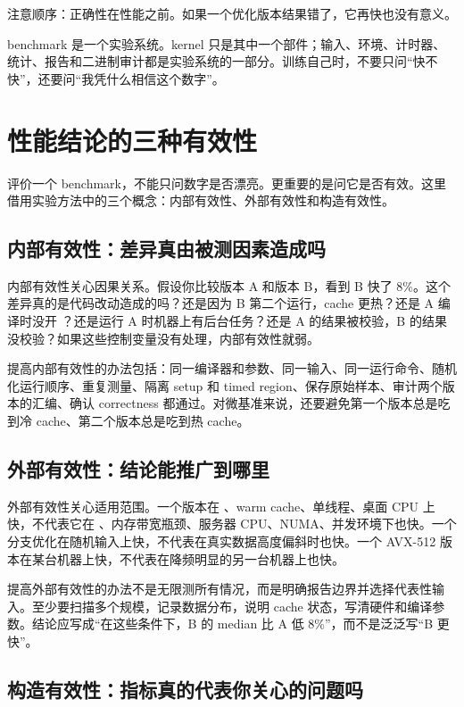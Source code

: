 注意顺序：正确性在性能之前。如果一个优化版本结果错了，它再快也没有意义。

\begin{mentalmodel}
benchmark 是一个实验系统。kernel 只是其中一个部件；输入、环境、计时器、统计、报告和二进制审计都是实验系统的一部分。训练自己时，不要只问“快不快”，还要问“我凭什么相信这个数字”。
\end{mentalmodel}

\section{性能结论的三种有效性}

评价一个 benchmark，不能只问数字是否漂亮。更重要的是问它是否有效。这里借用实验方法中的三个概念：内部有效性、外部有效性和构造有效性。

\subsection{内部有效性：差异真由被测因素造成吗}

内部有效性关心因果关系。假设你比较版本 A 和版本 B，看到 B 快了 8\%。这个差异真的是代码改动造成的吗？还是因为 B 第二个运行，cache 更热？还是 A 编译时没开 ？还是运行 A 时机器上有后台任务？还是 A 的结果被校验，B 的结果没校验？如果这些控制变量没有处理，内部有效性就弱。

提高内部有效性的办法包括：同一编译器和参数、同一输入、同一运行命令、随机化运行顺序、重复测量、隔离 setup 和 timed region、保存原始样本、审计两个版本的汇编、确认 correctness 都通过。对微基准来说，还要避免第一个版本总是吃到冷 cache、第二个版本总是吃到热 cache。

\subsection{外部有效性：结论能推广到哪里}

外部有效性关心适用范围。一个版本在 、warm cache、单线程、桌面 CPU 上快，不代表它在 、内存带宽瓶颈、服务器 CPU、NUMA、并发环境下也快。一个分支优化在随机输入上快，不代表在真实数据高度偏斜时也快。一个 AVX-512 版本在某台机器上快，不代表在降频明显的另一台机器上也快。

提高外部有效性的办法不是无限测所有情况，而是明确报告边界并选择代表性输入。至少要扫描多个规模，记录数据分布，说明 cache 状态，写清硬件和编译参数。结论应写成“在这些条件下，B 的 median 比 A 低 8\%”，而不是泛泛写“B 更快”。

\subsection{构造有效性：指标真的代表你关心的问题吗}

